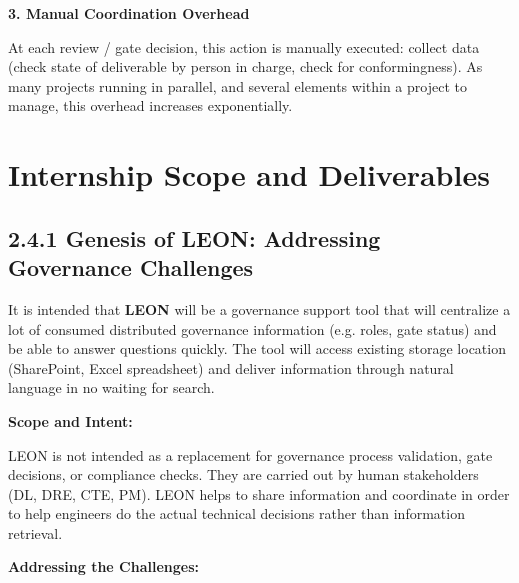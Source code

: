 \noindent\textbf{3. Manual Coordination Overhead}

At each review / gate decision, this action is manually executed: collect data (check state of deliverable by person in charge, check for conformingness). As many projects running in parallel, and several elements within a project to manage, this overhead increases exponentially.
\FloatBarrier

\section{\textcolor[HTML]{0066CC}{Internship Scope and Deliverables}}
\label{sec:internship-scope}

\vspace{0.3cm}

\subsection*{\textcolor[HTML]{003D99}{2.4.1 Genesis of LEON: Addressing Governance Challenges}}

It is intended that \textbf{\textcolor[HTML]{0066CC}{LEON}} will be a governance support tool that will centralize a lot of consumed distributed governance information (e.g. roles, gate status) and be able to answer questions quickly. The tool will access existing storage location (SharePoint, Excel spreadsheet) and deliver information through natural language in no waiting for search.

\vspace{0.2cm}

\noindent\textbf{Scope and Intent:}

LEON is not intended as a replacement for governance process validation, gate decisions, or compliance checks. They are carried out by human stakeholders (DL, DRE, CTE, PM). LEON helps to share information and coordinate in order to help engineers do the actual technical decisions rather than information retrieval.
\vspace{0.2cm}

\noindent\textbf{Addressing the Challenges:}

